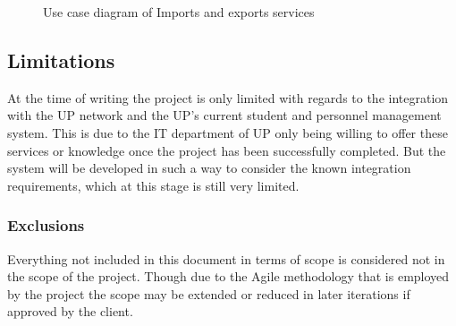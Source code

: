 \documentclass[12pt]{article}
\begin{document}
\begin{figure}[H]
\centering	
{}
\caption{Use case diagram of Imports and exports services}
\end{figure}

\vspace{0.2in}
\subsection{Limitations}
\vspace{0.2in}
At the time of writing the project is only limited with regards to the integration with the UP network and the UP's current student and personnel management system. This is due to the IT department of UP only being willing to offer these services or knowledge once the project has been successfully completed. But the system will be developed in such a way to consider the known integration requirements, which at this stage is still very limited.

\subsubsection{Exclusions}
\vspace{0.2in}
Everything not included in this document in terms of scope is considered not in the scope of the project. Though due to the Agile methodology that is employed by the project the scope may be extended or reduced in later iterations if approved by the client.
\vspace{0.2in}
\end{document}
